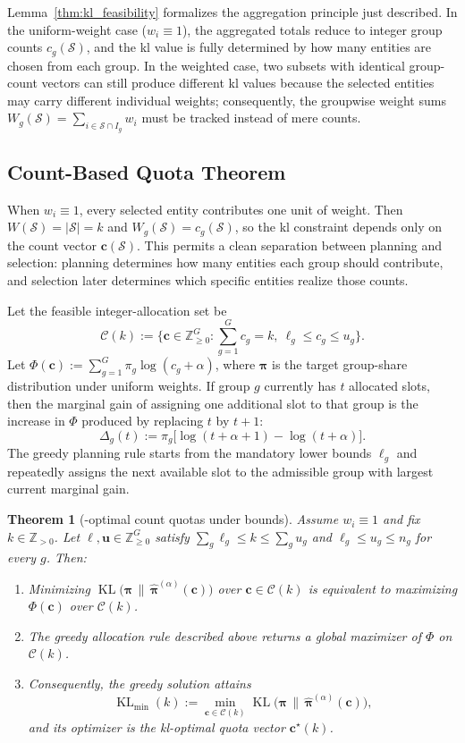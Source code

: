 \documentclass[10pt,journal]{IEEEtran}
\newcommand{\1}{\mathbf{1}}
\newcommand{\bc}{\mathbf{c}}
\newcommand{\bpi}{\boldsymbol{\pi}}
\newcommand{\Sel}{\mathcal{S}}
\DeclareMathOperator{\KL}{KL}
\theoremstyle{ieeethm}
\newtheorem{theorem}{Theorem}
\begin{document}
Lemma~\ref{thm:kl_feasibility} formalizes the aggregation principle just described. In the uniform-weight case ($w_i\equiv 1$), the aggregated totals reduce to integer group counts $c_g(\Sel)$, and the \gls{kl} value is fully determined by how many entities are chosen from each group. In the weighted case, two subsets with identical group-count vectors can still produce different \gls{kl} values because the selected entities may carry different individual weights; consequently, the groupwise weight sums $W_g(\Sel)=\sum_{i\in\Sel\cap I_g}w_i$ must be tracked instead of mere counts.

\subsection{Count-Based Quota Theorem}
\label{subsec:quota_thm}

When $w_i\equiv 1$, every selected entity contributes one unit of weight. Then $W(\Sel)=|\Sel|=k$ and $W_g(\Sel)=c_g(\Sel)$, so the \gls{kl} constraint depends only on the count vector $\bc(\Sel)$. This permits a clean separation between planning and selection: planning determines how many entities each group should contribute, and selection later determines which specific entities realize those counts.

Let the feasible integer-allocation set be
\begin{equation*}
\mathcal{C}(k)
:=
\big\{\bc\in\mathbb{Z}_{\ge 0}^{G}:\sum_{g=1}^{G}c_g=k,\ \ell_g\le c_g\le u_g\big\}.
\end{equation*}
Let $\Phi(\bc):=\sum_{g=1}^{G}\pi_g\log(c_g+\alpha)$, where $\bpi$ is the target group-share distribution under uniform weights. If group $g$ currently has $t$ allocated slots, then the marginal gain of assigning one additional slot to that group is the increase in $\Phi$ produced by replacing $t$ by $t+1$:
\[
\Delta_g(t)
:=
\pi_g\big[\log(t+\alpha+1)-\log(t+\alpha)\big].
\]
The greedy planning rule starts from the mandatory lower bounds $\ell_g$ and repeatedly assigns the next available slot to the admissible group with largest current marginal gain.

\begin{theorem}[-optimal count quotas under bounds]
\label{thm:quota}
Assume $w_i\equiv 1$ and fix $k\in\mathbb{Z}_{>0}$. Let $\boldsymbol{\ell},\mathbf u\in\mathbb{Z}_{\ge 0}^G$ satisfy $\sum_g \ell_g\le k\le \sum_g u_g$ and $\ell_g\le u_g\le n_g$ for every $g$. Then:
\begin{enumerate}[label=(\roman*)]
\item Minimizing $\KL\!\big(\bpi\,\big\|\,\widehat{\bpi}^{(\alpha)}(\bc)\big)$ over $\bc\in\mathcal{C}(k)$ is equivalent to maximizing $\Phi(\bc)$ over $\mathcal{C}(k)$.
\item The greedy allocation rule described above returns a global maximizer of $\Phi$ on $\mathcal{C}(k)$.
\item Consequently, the greedy solution attains
\[
\KL_{\min}(k)
:=
\min_{\bc\in\mathcal{C}(k)}
\KL\!\big(\bpi\,\big\|\,\widehat{\bpi}^{(\alpha)}(\bc)\big),
\]
and its optimizer is the \gls{kl}-optimal quota vector $\bc^\star(k)$.
\end{enumerate}
\end{theorem}
\end{document}
